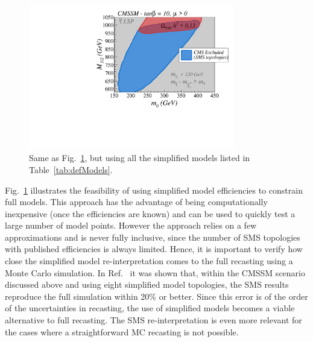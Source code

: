 \begin{figure}[!h]
\centering
\includegraphics[width=0.8\textwidth]{ch5-figures/sms_exclusion_all.pdf}
\caption{Same as Fig.~\ref{fig:cmssmB}, but using all the simplified
models listed in Table~\ref{tab:defModels}.
}
\label{fig:cmssmB}
\end{figure}


Fig.~\ref{fig:cmssmB} illustrates the feasibility of using simplified
model efficiencies to constrain full models.
This approach has the advantage of being computationally inexpensive
(once the efficiencies are known) and can be used to quickly test
a large number of model points. However the approach relies on a few
approximations and is never fully inclusive, since the number of  SMS topologies
with published efficiencies is always limited.
Hence, it is important to verify
how close the simplified model re-interpretation comes to the full recasting
using a Monte Carlo simulation.
In Ref.~\cite{Heisig:2015yla} it was shown that, within
the CMSSM scenario discussed above and using eight simplified model
topologies, the SMS results reproduce the full simulation within
20\% or better.
Since this error is of the order of the uncertainties in recasting,
the use of simplified models becomes a viable alternative to full recasting.
The SMS re-interpretation is  even more relevant for the cases
where a straightforward MC recasting is not possible.


\vskip 0.1in
\vskip 0.1in


